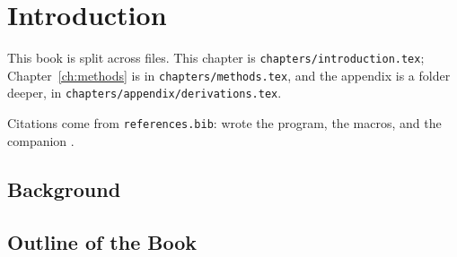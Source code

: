 \chapter{Introduction}\label{ch:intro}

This book is split across files. This chapter is \texttt{chapters/introduction.tex};
Chapter~\ref{ch:methods} is in \texttt{chapters/methods.tex}, and the appendix is
a folder deeper, in \texttt{chapters/appendix/derivations.tex}.

Citations come from \texttt{references.bib}: \textcite{knuth1984} wrote the
program, \textcite{lamport1994} the macros, and \textcite{mittelbach2023} the
companion \parencite[see also][]{oetiker2023}.

\section{Background}
\lipsum[1-3]

\section{Outline of the Book}
\lipsum[4-5]
